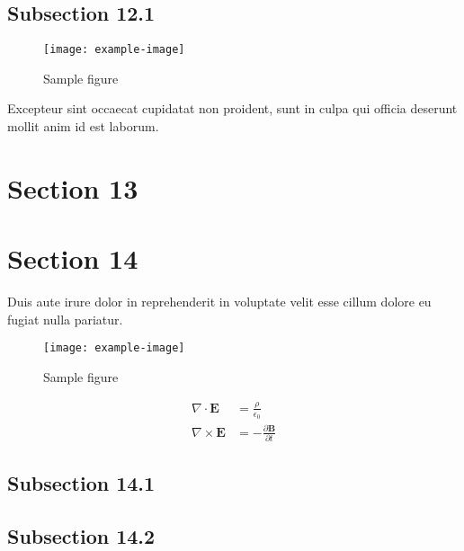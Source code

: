 \documentclass{article}
\begin{document}

\subsection{Subsection 12.1}

\begin{figure}[h]
    \centering
    \texttt{[image: example-image]}
    \caption{Sample figure}
    \label{fig:sample}
\end{figure}

Excepteur sint occaecat cupidatat non proident, sunt in culpa qui officia deserunt mollit anim id est laborum.

\section{Section 13}

\section{Section 14}

Duis aute irure dolor in reprehenderit in voluptate velit esse cillum dolore eu fugiat nulla pariatur.

\begin{figure}[h]
    \centering
    \texttt{[image: example-image]}
    \caption{Sample figure}
    \label{fig:sample}
\end{figure}

\begin{align}
    \nabla \cdot \mathbf{E} &= \frac{\rho}{\epsilon_0} \\
    \nabla \times \mathbf{E} &= -\frac{\partial \mathbf{B}}{\partial t}
\end{align}

\subsection{Subsection 14.1}

\subsection{Subsection 14.2}
\end{document}
